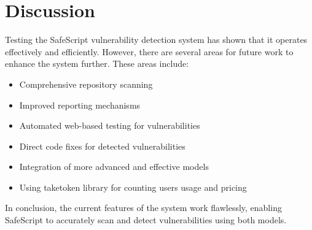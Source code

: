 \chapter{Discussion}\label{chap:discussion}

Testing the SafeScript vulnerability detection system has shown that it operates effectively and efficiently. However, there are several areas for future work to enhance the system further. These areas include:

\begin{itemize}
\item Comprehensive repository scanning
\item Improved reporting mechanisms
\item Automated web-based testing for vulnerabilities
\item Direct code fixes for detected vulnerabilities
\item Integration of more advanced and effective models
\item Using taketoken library for counting users usage and pricing
\end{itemize}

In conclusion, the current features of the system work flawlessly, enabling SafeScript to accurately scan and detect vulnerabilities using both models.